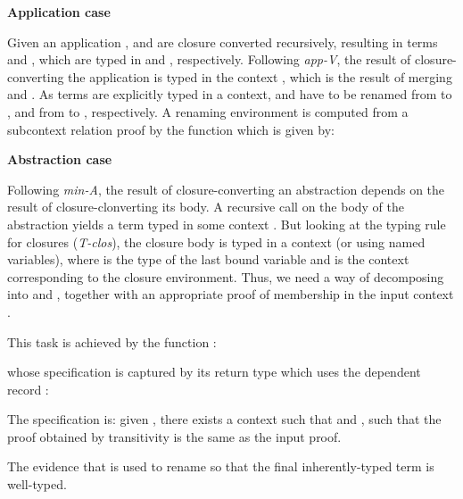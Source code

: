 \documentclass[bsc,frontabs,oneside,singlespacing,parskip,deptreport]{infthesis}
\theoremstyle{definition}
\theoremstyle{lemma}
\begin{document}
\textbf{Application case}


Given an application ,  and  are closure
converted recursively, resulting in terms  and , which
are typed in  and , respectively. Following
\textit{app-V}, the result of closure-converting the application is
typed in the context , which is the result of merging 
and . As terms are explicitly typed in a context,  and
 have to be renamed from  to , and from 
to , respectively. A renaming environment is computed from a
subcontext relation proof by the function  which is given by:


\textbf{Abstraction case}


Following \textit{min-A}, the result of closure-converting an
abstraction depends on the result  of closure-clonverting its
body. A recursive call on the body of the abstraction yields a term
typed in some context . But looking at the typing rule for
closures (\textit{T-clos}), the closure body is typed in a context
 (or  using named variables), where  is
the type of the last bound variable and  is the context
corresponding to the closure environment. Thus, we need a way of
decomposing  into  and , together with an
appropriate proof of membership in the input context .

This task is achieved by the function :


whose specification is captured by its return type which uses the
dependent record :


The specification is: given , there exists a context
 such that  and , such that the
proof  obtained by transitivity is the same as the input
proof.

The evidence that  is used to rename  so that
the final inherently-typed term is well-typed.
\end{document}
